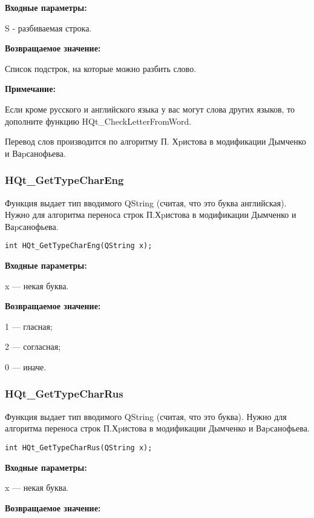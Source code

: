 \documentclass[a4paper,12pt]{article}
\begin{document}
\textbf{Входные параметры:}

S - разбиваемая строка.

\textbf{Возвращаемое значение:}
 
Список подстрок, на которые можно разбить слово.

\textbf{Примечание:}

     Если кроме русского и английского языка у вас могут слова других языков, то дополните функцию HQt\_CheckLetterFromWord.
	 
	 Перевод слов производится по алгоритму П. Хpистова в модификации Дымченко и Ваpсанофьева.


\subsubsection{HQt\_GetTypeCharEng}\label{HQt_GetTypeCharEng}

Функция выдает тип вводимого QString (считая, что это буква английская). Нужно для алгоритма переноса строк П.Хpистова в модификации Дымченко и Ваpсанофьева.


\begin{lstlisting}[label=code_syntax_HQt_GetTypeCharEng,caption=Синтаксис]
int HQt_GetTypeCharEng(QString x);
\end{lstlisting}

\textbf{Входные параметры:}

x --- некая буква.

\textbf{Возвращаемое значение:}

     1 --- гласная;
	 
     2 --- согласная;
	 
     0 --- иначе.


\subsubsection{HQt\_GetTypeCharRus}\label{HQt_GetTypeCharRus}

Функция выдает тип вводимого QString (считая, что это буква). Нужно для алгоритма переноса строк П.Хpистова в модификации Дымченко и Ваpсанофьева.


\begin{lstlisting}[label=code_syntax_HQt_GetTypeCharRus,caption=Синтаксис]
int HQt_GetTypeCharRus(QString x);
\end{lstlisting}

\textbf{Входные параметры:}

x --- некая буква.

\textbf{Возвращаемое значение:}
\end{document}
